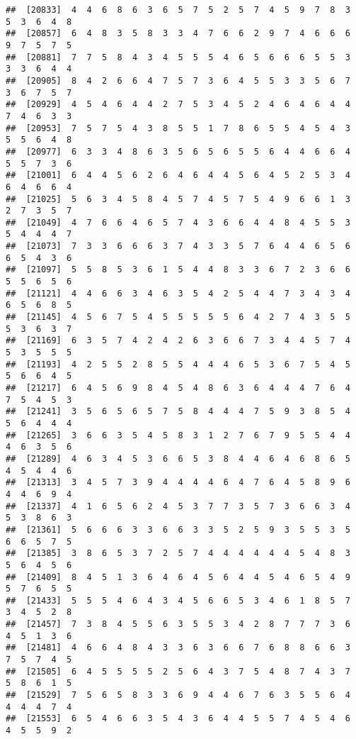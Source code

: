 \documentclass[
]{book}
\begin{document}
\begin{verbatim}
##  [20833]  4  4  6  8  6  3  6  5  7  5  2  5  7  4  5  9  7  8  3  5  3  6  4  8
##  [20857]  6  4  8  3  5  8  3  3  4  7  6  6  2  9  7  4  6  6  6  9  7  5  7  5
##  [20881]  7  7  5  8  4  3  4  5  5  5  4  6  5  6  6  6  5  5  3  3  3  6  4  4
##  [20905]  8  4  2  6  6  4  7  5  7  3  6  4  5  5  3  3  5  6  7  3  6  7  5  7
##  [20929]  4  5  4  6  4  4  2  7  5  3  4  5  2  4  6  4  6  4  4  7  4  6  3  3
##  [20953]  7  5  7  5  4  3  8  5  5  1  7  8  6  5  5  4  5  4  3  5  5  6  4  8
##  [20977]  6  3  3  4  8  6  3  5  6  5  6  5  5  6  4  4  6  6  4  5  5  7  3  6
##  [21001]  6  4  4  5  6  2  6  4  6  4  4  5  6  4  5  2  5  3  4  6  4  6  6  4
##  [21025]  5  6  3  4  5  8  4  5  7  4  5  7  5  4  9  6  6  1  3  2  7  3  5  7
##  [21049]  4  7  6  6  4  6  5  7  4  3  6  6  4  4  8  4  5  5  3  5  4  4  4  7
##  [21073]  7  3  3  6  6  6  3  7  4  3  3  5  7  6  4  4  6  5  6  6  5  4  3  6
##  [21097]  5  5  8  5  3  6  1  5  4  4  8  3  3  6  7  2  3  6  6  5  5  6  5  6
##  [21121]  4  4  6  6  3  4  6  3  5  4  2  5  4  4  7  3  4  3  4  6  5  6  8  5
##  [21145]  4  5  6  7  5  4  5  5  5  5  5  6  4  2  7  4  3  5  5  5  3  6  3  7
##  [21169]  6  3  5  7  4  2  4  2  6  3  6  6  7  3  4  4  5  7  4  5  3  5  5  5
##  [21193]  4  2  5  5  2  8  5  5  4  4  4  6  5  3  6  7  5  4  5  5  6  6  4  5
##  [21217]  6  4  5  6  9  8  4  5  4  8  6  3  6  4  4  4  7  6  4  7  5  4  5  3
##  [21241]  3  5  6  5  6  5  7  5  8  4  4  4  7  5  9  3  8  5  4  5  6  4  4  4
##  [21265]  3  6  6  3  5  4  5  8  3  1  2  7  6  7  9  5  5  4  4  4  6  3  5  6
##  [21289]  4  6  3  4  5  3  6  6  5  3  8  4  4  6  4  6  8  6  5  4  5  4  4  6
##  [21313]  3  4  5  7  3  9  4  4  4  4  6  4  7  6  4  5  8  9  6  4  4  6  9  4
##  [21337]  4  1  6  5  6  2  4  5  3  7  7  3  5  7  3  6  6  3  4  5  3  8  6  3
##  [21361]  5  6  6  6  3  3  6  6  3  3  5  2  5  9  3  5  5  3  5  6  6  5  7  5
##  [21385]  3  8  6  5  3  7  2  5  7  4  4  4  4  4  4  5  4  8  3  5  6  4  5  6
##  [21409]  8  4  5  1  3  6  4  6  4  5  6  4  4  5  4  6  5  4  9  5  7  6  5  5
##  [21433]  5  5  5  4  6  4  3  4  5  6  6  5  3  4  6  1  8  5  7  3  4  5  2  8
##  [21457]  7  3  8  4  5  5  6  3  5  5  3  4  2  8  7  7  7  3  6  4  5  1  3  6
##  [21481]  4  6  6  4  8  4  3  3  6  3  6  6  7  6  8  8  6  6  3  7  5  7  4  5
##  [21505]  6  4  5  5  5  5  2  5  6  4  3  7  5  4  8  7  4  3  7  5  8  6  1  5
##  [21529]  7  5  6  5  8  3  3  6  9  4  4  6  7  6  3  5  5  6  4  4  4  4  7  4
##  [21553]  6  5  4  6  6  3  5  4  3  6  4  4  5  5  7  4  5  4  6  4  5  5  9  2

\end{verbatim}
\end{document}
